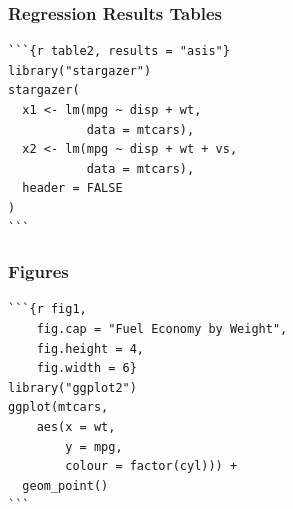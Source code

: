 \documentclass[14pt]{beamer}
\begin{document}
\begin{frame}[fragile]
\frametitle{Regression Results Tables}
\begin{verbatim}
```{r table2, results = "asis"}
library("stargazer")
stargazer(
  x1 <- lm(mpg ~ disp + wt, 
           data = mtcars),
  x2 <- lm(mpg ~ disp + wt + vs, 
           data = mtcars),
  header = FALSE
)
```
\end{verbatim}
\end{frame}


\begin{frame}[fragile]
\frametitle{Figures}	
\begin{verbatim}
```{r fig1, 
    fig.cap = "Fuel Economy by Weight",
    fig.height = 4,
    fig.width = 6}
library("ggplot2")
ggplot(mtcars, 
    aes(x = wt, 
        y = mpg,
        colour = factor(cyl))) + 
  geom_point()
```
\end{verbatim}
\end{frame}
\end{document}
